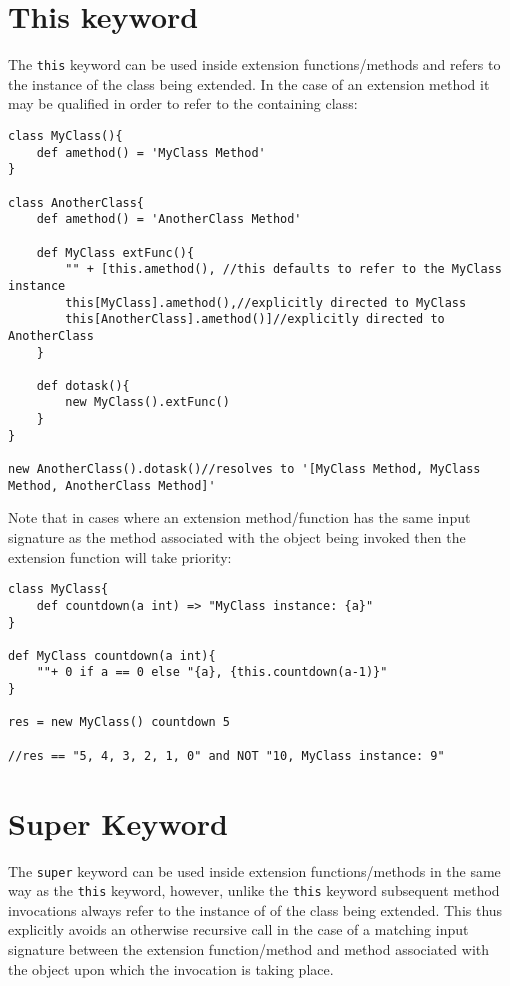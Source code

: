 \documentclass[conc-doc]{subfiles}
\begin{document}
\section{This keyword}
The \lstinline{this} keyword can be used inside extension functions/methods and refers to the instance of the class being extended. In the case of an extension method it may be qualified in order to refer to the containing class:

\begin{lstlisting}
class MyClass(){
	def amethod() = 'MyClass Method'
}

class AnotherClass{
	def amethod() = 'AnotherClass Method'
	
	def MyClass extFunc(){
		"" + [this.amethod(), //this defaults to refer to the MyClass instance
		this[MyClass].amethod(),//explicitly directed to MyClass
		this[AnotherClass].amethod()]//explicitly directed to AnotherClass
	}
	
	def dotask(){
		new MyClass().extFunc()
	}
}

new AnotherClass().dotask()//resolves to '[MyClass Method, MyClass Method, AnotherClass Method]'
\end{lstlisting}

Note that in cases where an extension method/function has the same input signature as the method associated with the object being invoked then the extension function will take priority:

\begin{lstlisting}
class MyClass{
	def countdown(a int) => "MyClass instance: {a}"
}

def MyClass countdown(a int){
	""+ 0 if a == 0 else "{a}, {this.countdown(a-1)}"
} 

res = new MyClass() countdown 5

//res == "5, 4, 3, 2, 1, 0" and NOT "10, MyClass instance: 9"
\end{lstlisting}

\section{Super Keyword}
The \lstinline{super} keyword can be used inside extension functions/methods in the same way as the \lstinline{this} keyword, however, unlike the \lstinline{this} keyword subsequent method invocations always refer to the instance of of the class being extended. This thus explicitly avoids an otherwise recursive call in the case of a matching input signature between the extension function/method and method associated with the object upon which the invocation is taking place.
\end{document}
